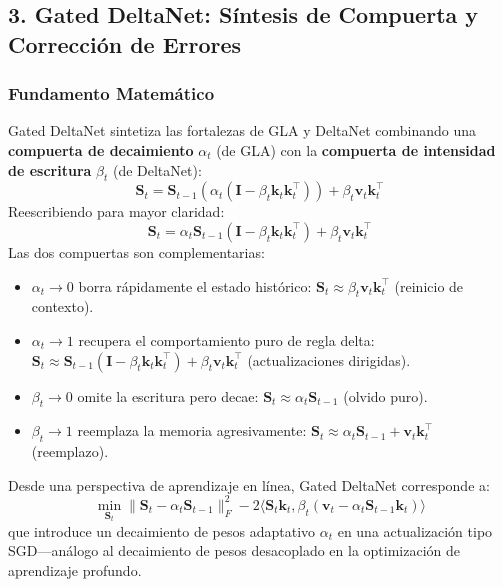 \documentclass[11pt,a4paper]{article}
\begin{document}
\subsection{3. Gated DeltaNet: Síntesis de Compuerta y Corrección de Errores}

\subsubsection{Fundamento Matemático}

Gated DeltaNet \citep{yang_gated_deltanet_2024} sintetiza las fortalezas de GLA y DeltaNet combinando una \textbf{compuerta de decaimiento} $\alpha_t$ (de GLA) con la \textbf{compuerta de intensidad de escritura} $\beta_t$ (de DeltaNet):
\[
\mathbf{S}_t = \mathbf{S}_{t-1}\left(\alpha_t (\mathbf{I} - \beta_t \mathbf{k}_t \mathbf{k}_t^\top)\right) + \beta_t \mathbf{v}_t \mathbf{k}_t^\top
\]
Reescribiendo para mayor claridad:
\[
\mathbf{S}_t = \alpha_t \mathbf{S}_{t-1}(\mathbf{I} - \beta_t \mathbf{k}_t \mathbf{k}_t^\top) + \beta_t \mathbf{v}_t \mathbf{k}_t^\top
\]
Las dos compuertas son complementarias:
\begin{itemize}[leftmargin=*]
    \item $\alpha_t \to 0$ borra rápidamente el estado histórico: $\mathbf{S}_t \approx \beta_t \mathbf{v}_t \mathbf{k}_t^\top$ (reinicio de contexto).
    \item $\alpha_t \to 1$ recupera el comportamiento puro de regla delta: $\mathbf{S}_t \approx \mathbf{S}_{t-1}(\mathbf{I} - \beta_t \mathbf{k}_t \mathbf{k}_t^\top) + \beta_t \mathbf{v}_t \mathbf{k}_t^\top$ (actualizaciones dirigidas).
    \item $\beta_t \to 0$ omite la escritura pero decae: $\mathbf{S}_t \approx \alpha_t \mathbf{S}_{t-1}$ (olvido puro).
    \item $\beta_t \to 1$ reemplaza la memoria agresivamente: $\mathbf{S}_t \approx \alpha_t \mathbf{S}_{t-1} + \mathbf{v}_t \mathbf{k}_t^\top$ (reemplazo).
\end{itemize}

Desde una perspectiva de aprendizaje en línea, Gated DeltaNet corresponde a:
\[
\min_{\mathbf{S}_t} \|\mathbf{S}_t - \alpha_t \mathbf{S}_{t-1}\|_F^2 - 2\langle \mathbf{S}_t \mathbf{k}_t, \beta_t(\mathbf{v}_t - \alpha_t \mathbf{S}_{t-1} \mathbf{k}_t)\rangle
\]
que introduce un decaimiento de pesos adaptativo $\alpha_t$ en una actualización tipo SGD---análogo al decaimiento de pesos desacoplado en la optimización de aprendizaje profundo.
\end{document}
